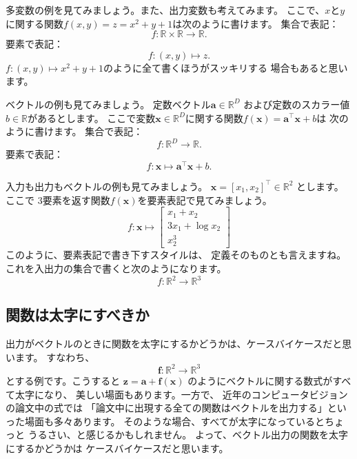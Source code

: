 \documentclass[uplatex,twocolumn,9pt,dvipdfmx]{jsarticle}
\begin{document}
多変数の例を見てみましょう。また、出力変数も考えてみます。
ここで、$x$と$y$に関する関数$f(x, y) = z = x^2 + y + 1$は次のように書けます。
集合で表記：
\begin{equation}
    f: \mathbb{R} \times \mathbb{R} \to \mathbb{R}.
\end{equation}
要素で表記：
\begin{equation}
    f: (x, y) \mapsto z.
\end{equation}
$f: (x, y) \mapsto x^2 + y + 1$のように全て書くほうがスッキリする
場合もあると思います。

ベクトルの例も見てみましょう。
定数ベクトル$\mathbf{a} \in \mathbb{R}^D$ および定数のスカラー値 $b \in \mathbb{R}$があるとします。
ここで変数$\mathbf{x} \in \mathbb{R}^D$に関する関数$f(\mathbf{x}) = \mathbf{a}^\top \mathbf{x} + b$は
次のように書けます。
集合で表記：
\begin{equation}
    f: \mathbb{R}^D \to \mathbb{R}.
\end{equation}
要素で表記：
\begin{equation}
    f: \mathbf{x} \mapsto \mathbf{a}^\top \mathbf{x} + b.
\end{equation}

入力も出力もベクトルの例も見てみましょう。
$\mathbf{x} = [x_1, x_2]^\top \in \mathbb{R}^2$
とします。ここで
3要素を返す関数$f(\mathbf{x})$を要素表記で見てみましょう。
\begin{equation}
f: \mathbf{x} \mapsto \begin{bmatrix}
    x_1 + x_2 \\
    3x_1 + \log x_2 \\
    x_2^3
\end{bmatrix}
\end{equation}
このように、要素表記で書き下すスタイルは、
定義そのものとも言えますね。
これを入出力の集合で書くと次のようになります。
\begin{equation}
    f: \mathbb{R}^2 \to \mathbb{R}^3
\end{equation}

\subsection{関数は太字にすべきか}
出力がベクトルのときに関数を太字にするかどうかは、ケースバイケースだと思います。
すなわち、
\begin{equation}
    \mathbf{f}: \mathbb{R}^2 \to \mathbb{R}^3
\end{equation}
とする例です。こうすると
$\mathbf{z} = \mathbf{a} + \mathbf{f}(\mathbf{x})$
のようにベクトルに関する数式がすべて太字になり、
美しい場面もあります。一方で、
近年のコンピュータビジョンの論文中の式では
「論文中に出現する全ての関数はベクトルを出力する」といった場面も多々あります。
そのような場合、すべてが太字になっているとちょっと
うるさい、と感じるかもしれません。
よって、ベクトル出力の関数を太字にするかどうかは
ケースバイケースだと思います。
\end{document}
